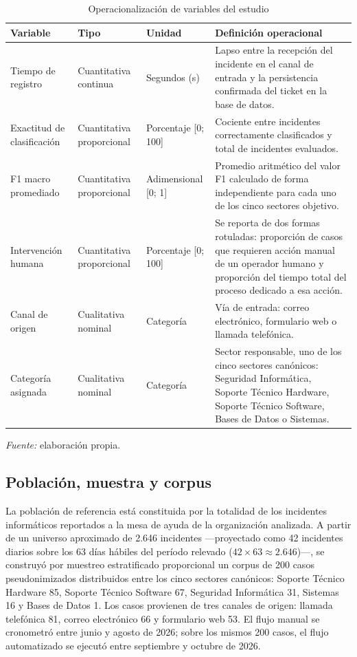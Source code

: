 \begin{table}[htbp]
\centering
\caption{Operacionalización de variables del estudio}
\label{tab:variables}
\small
\begin{tabular}{@{}>{\raggedright\arraybackslash}p{2.5cm} >{\raggedright\arraybackslash}p{3.2cm} >{\raggedright\arraybackslash}p{2.3cm} >{\raggedright\arraybackslash}p{5.4cm}@{}}
\toprule
\textbf{Variable} & \textbf{Tipo} & \textbf{Unidad} & \textbf{Definición operacional} \\
\midrule
Tiempo de registro & Cuantitativa continua & Segundos (s) & Lapso entre la recepción del incidente en el canal de entrada y la persistencia confirmada del ticket en la base de datos. \\
Exactitud de clasificación & Cuantitativa proporcional & Porcentaje [0; 100] & Cociente entre incidentes correctamente clasificados y total de incidentes evaluados. \\
F1 macro promediado & Cuantitativa proporcional & Adimensional [0; 1] & Promedio aritmético del valor F1 calculado de forma independiente para cada uno de los cinco sectores objetivo. \\
Intervención humana & Cuantitativa proporcional & Porcentaje [0; 100] & Se reporta de dos formas rotuladas: proporción de casos que requieren acción manual de un operador humano y proporción del tiempo total del proceso dedicado a esa acción. \\
Canal de origen & Cualitativa nominal & Categoría & Vía de entrada: correo electrónico, formulario web o llamada telefónica. \\
Categoría asignada & Cualitativa nominal & Categoría & Sector responsable, uno de los cinco sectores canónicos: Seguridad Informática, Soporte Técnico Hardware, Soporte Técnico Software, Bases de Datos o Sistemas. \\
\bottomrule
\end{tabular}
\par\smallskip
{\footnotesize\textit{Fuente:} elaboración propia.\par}
\end{table}

\subsection{Población, muestra y corpus}\label{subsec:poblacion-muestra-corpus}

La población de referencia está constituida por la totalidad de los incidentes informáticos reportados a la mesa de ayuda de la organización analizada. A partir de un universo aproximado de 2.646 incidentes ---proyectado como 42 incidentes diarios sobre los 63 días hábiles del período relevado (\(42 \times 63 \approx 2.646\))---, se construyó por muestreo estratificado proporcional un corpus de 200 casos pseudonimizados distribuidos entre los cinco sectores canónicos: Soporte Técnico Hardware 85, Soporte Técnico Software 67, Seguridad Informática 31, Sistemas 16 y Bases de Datos 1. Los casos provienen de tres canales de origen: llamada telefónica 81, correo electrónico 66 y formulario web 53. El flujo manual se cronometró entre junio y agosto de 2026; sobre los mismos 200 casos, el flujo automatizado se ejecutó entre septiembre y octubre de 2026.

